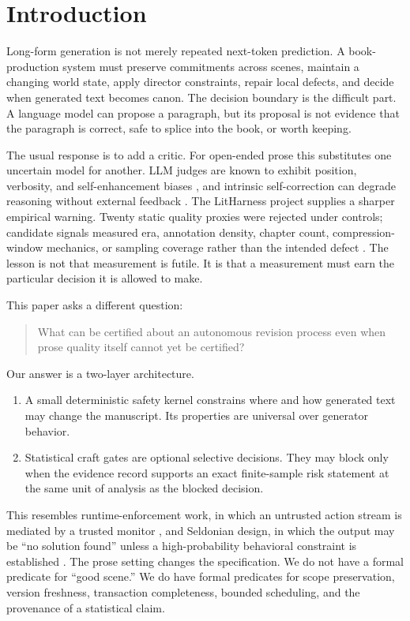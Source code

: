 \documentclass[11pt]{article}
\begin{document}
\section{Introduction}

Long-form generation is not merely repeated next-token prediction. A book-production
system must preserve commitments across scenes, maintain a changing world state, apply
director constraints, repair local defects, and decide when generated text becomes canon.
The decision boundary is the difficult part. A language model can propose a paragraph, but
its proposal is not evidence that the paragraph is correct, safe to splice into the book,
or worth keeping.

The usual response is to add a critic. For open-ended prose this substitutes one uncertain
model for another. LLM judges are known to exhibit position, verbosity, and self-enhancement
biases \cite{zheng2023judge}, and intrinsic self-correction can degrade reasoning without
external feedback \cite{huang2024selfcorrect}. The LitHarness project supplies a sharper
empirical warning. Twenty static quality proxies were rejected under controls; candidate
signals measured era, annotation density, chapter count, compression-window mechanics, or
sampling coverage rather than the intended defect \cite{litharnessbrief}. The lesson is not
that measurement is futile. It is that a measurement must earn the particular decision it
is allowed to make.

This paper asks a different question:

\begin{quote}
What can be certified about an autonomous revision process even when prose quality itself
cannot yet be certified?
\end{quote}

Our answer is a two-layer architecture.

\begin{enumerate}
  \item A small deterministic safety kernel constrains where and how generated text may
  change the manuscript. Its properties are universal over generator behavior.
  \item Statistical craft gates are optional selective decisions. They may block only when
  the evidence record supports an exact finite-sample risk statement at the same unit of
  analysis as the blocked decision.
\end{enumerate}

This resembles runtime-enforcement work, in which an untrusted action stream is mediated by
a trusted monitor \cite{ligatti2005edit}, and Seldonian design, in which the output may be
``no solution found'' unless a high-probability behavioral constraint is established
\cite{thomas2019seldonian}. The prose setting changes the specification. We do not have a
formal predicate for ``good scene.'' We do have formal predicates for scope preservation,
version freshness, transaction completeness, bounded scheduling, and the provenance of a
statistical claim.
\end{document}
